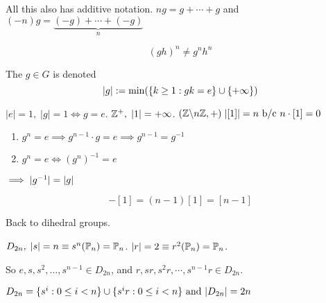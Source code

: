 \documentclass[12pt]{article}
\begin{document}
All this also has additive notation.
\(ng=g+\cdots+g\) and
\((-n)g=\underset n{\underbrace{(-g)+\cdots+(-g)}}\)


\bboxnote
{} 
\[(gh)^n\neq g^nh^n\]
\ebox


\bbox
\begin{defn}\label{defn:order_of_and_elem}
  The  \(g\in G\) is denoted
  \[|g|:=\mathrm{min}(\{k\ge 1:gk=e\}\cup\{+\infty\})\]
\end{defn}
\ebox

\bboxex
{} \(|e|=1,\;|g|=1\iff g=e\).
\(\mathbb Z^+,\;|1|=+\infty\). 
\((\mathbb Z\backslash n\mathbb Z,+)\;|[1]|=n\text{ b/c }
n\cdot[1]=0\)
\ebox

\bbox
\begin{lem}\label{lem:prop_of_order}
  \begin{enumerate}
    \item \(g^n=e\implies g^{n-1}\cdot g=e\implies g^{n-1}=g^{-1}\)
    \item \(g^n=e\iff(g^n)^{-1}=e\)
  \end{enumerate}
  \(\implies|g^{-1}|=|g|\)
\end{lem}
\ebox


\bboxex
{}
\[-[1]=(n-1)[1]=[n-1]\]
\ebox

Back to dihedral groups.

\(D_{2n},\;|s|=n\equiv s^n(\mathbb P_n)=\mathbb P_n\).
\(|r|=2\equiv r^2(\mathbb P_n)=\mathbb P_n\).

So \(e,s,s^2,\dots,s^{n-1}\in D_{2n}\),
and \(r,sr,s^2r,\cdots,s^{n-1}r\in D_{2n}\).


\bbox
\begin{prop}\label{prop:dihedral_group_explicit_classification}
  \(D_{2n}=
  \{s^i:0\le i<n\}\cup
  \{s^ir:0\le i<n\}\text{ and }
  |D_{2n}|=2n\)
\end{prop}
\ebox
\end{document}
